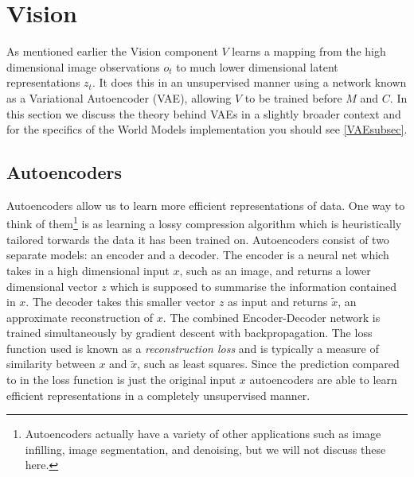 \documentclass{article}
\numberwithin{figure}{section}
\theoremstyle{definition}
\begin{document}



\section{Vision}
As mentioned earlier the Vision component $V$ learns a mapping from the high dimensional image observations $o_t$ to much lower dimensional latent representations $z_t$.
It does this in an unsupervised manner using a network known as a Variational Autoencoder (VAE), allowing $V$ to be trained before $M$ and $C$.
In this section we discuss the theory behind VAEs in a slightly broader context and for the specifics of the World Models implementation you should see \ref{VAEsubsec}.




\subsection{Autoencoders}
Autoencoders allow us to learn more efficient representations of data.
One way to think of them\footnote{Autoencoders actually have a variety of other applications such as image infilling, image segmentation, and denoising, but we will not discuss these here.} is as learning a lossy compression algorithm which is heuristically tailored torwards the data it has been trained on.
Autoencoders consist of two separate models: an encoder and a decoder. %
The encoder is a neural net which takes in a high dimensional input $x$, such as an image, and returns a lower dimensional vector $z$ which is supposed to summarise the information contained in $x$.
The decoder takes this smaller vector $z$ as input and returns $\widetilde{x}$, an approximate reconstruction of $x$.
The combined Encoder-Decoder network is trained simultaneously by gradient descent with backpropagation.
The loss function used is known as a \textit{reconstruction loss} and is typically a measure of similarity between $x$ and $\widetilde{x}$, such as least squares.
Since the prediction compared to in the loss function is just the original input $x$ autoencoders are able to learn efficient representations in a completely unsupervised manner.
\end{document}
